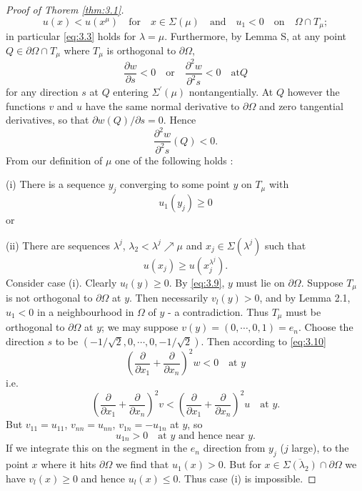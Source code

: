 \begin{proof}[Proof of Thorem \ref{thm:3.1}]
\begin{equation}
    u(x)<u(x^{\mu})\quad\text{for}\quad x\in\Sigma(\mu)\quad\text{and}\quad u_1<0\quad\text{on}\quad\Omega\cap T_{\mu};
  \end{equation}
  in particular \eqref{eq:3.3} holds for $\lambda=\mu$. Furthermore, by Lemma S, at any point $Q\in\partial\Omega\cap T_{\mu}$ where $T_{\mu}$ is orthogonal to $\partial\Omega$,
  \[\frac{\partial w}{\partial s}<0\quad\text{or}\quad\frac{\partial^2 w}{\partial^2 s}<0\quad\text{at} Q\]
  for any direction $s$ at $Q$ entering $\Sigma^{\prime}(\mu)$ nontangentially. At $Q$ however the functions $v$ and $u$ have the same normal derivative to $\partial\Omega$ and zero tangential derivatives, so that $\partial w(Q)/\partial s=0$. Hence
  \begin{equation}\label{eq:3.10}
    \frac{\partial^2 w}{\partial^2 s}(Q)<0.
  \end{equation}
  From our definition of $\mu$ one of the following holds :
  
  (i) There is a sequence $y_j$ converging to some point $y$ on $T_{\mu}$ with
  \[u_1(y_j)\geq 0\]
  or
  
  (ii) There are sequences $\lambda^j$, $ \lambda_2<\lambda^j\nearrow\mu$ and $x_j\in\Sigma(\lambda^j)$ such that
  \begin{equation}\label{eq:3.11}
    u(x_j)\geq  u(x_j^{\lambda^j}).
  \end{equation}
  Consider case (i). Clearly $u_l(y)\geq 0$. By \eqref{eq:3.9}, $y$ must lie on $\partial\Omega$. Suppose $T_{\mu}$ is not orthogonal to $\partial\Omega$ at $y$. Then necessarily $v_l(y)>0$, and by Lemma 2.1, $u_1 <0$ in a neighbourhood in $\Omega$ of $y$ - a contradiction. Thus $T_{\mu}$ must be orthogonal to $\partial\Omega$ at $y$; we may suppose $v(y)=(0,\cdots,0,1)= e_n$. Choose the direction $s$ to be $(- 1/\sqrt{2}, 0, \cdots, 0, - 1/\sqrt{2})$. Then according to \eqref{eq:3.10}
  \[\left( \frac{\partial}{\partial x_1} + \frac{\partial}{\partial x_n} \right)^2 w < 0 \quad\text{at } y\]
  i.e.
  \[\left(\frac{\partial}{\partial x_1} + \frac{\partial}{\partial x_n} \right)^2 v < \left(\frac{\partial}{\partial x_1} + \frac{\partial}{\partial x_n} \right)^2 u  \quad\text{at } y.\]
  But $v_{11}=u_{11}$, $v_{nn}=u_{nn}$, $v_{1n}=-u_{1n}$ at $y$, so
  \[u_{1n}>0\quad\text{at $y$ and hence near $y$.}\]
  If we integrate this on the segment in the $e_n$ direction from $y_j$ ($j$ large), to the point $x$ where it hits $\partial\Omega$ we find that $u_1(x)>0$. But for $x\in\overline{\Sigma(\lambda_2)}\cap\partial\Omega$ we have $v_l(x)\geq 0$ and hence $u_l(x)\leq 0$. Thus case (i) is impossible.
  

\end{proof}
